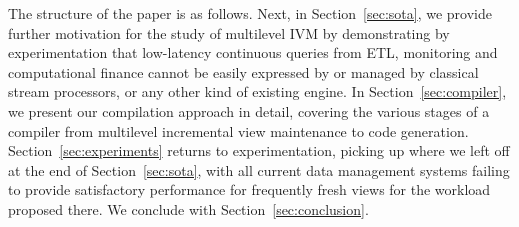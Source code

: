 

\medskip

The structure of the paper is as follows. Next, in Section~\ref{sec:sota}, we provide further motivation for the study of multilevel IVM by demonstrating by experimentation that low-latency continuous queries from ETL, monitoring and computational finance cannot be easily expressed by or managed by classical stream processors, or any other kind of existing engine. 
In Section~\ref{sec:compiler}, we present our compilation approach in detail, covering the various stages of a compiler from multilevel
incremental view maintenance to code generation.
Section~\ref{sec:experiments} returns to experimentation, picking up where we left off at the end of Section~\ref{sec:sota}, with all current data management systems failing to provide satisfactory performance for frequently fresh views for the workload proposed there.
We conclude with Section~\ref{sec:conclusion}.

